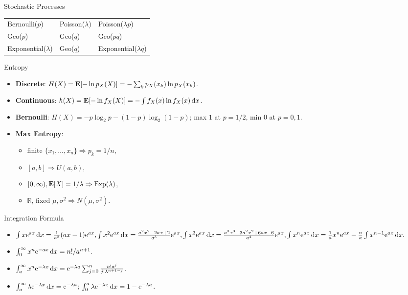 \documentclass[landscape,a4paper]{article}
\begin{document}
\begin{cheatsheetcolumns}
\begin{card}{Stochastic Processes}
\begin{itemize}
\begin{center}
\begin{tabular}{@{}lll@{}}
						Bernoulli($p$) & Poisson($\lambda$) & Poisson($\lambda p$)\\
						Geo($p$) & Geo($q$) & Geo($pq$)\\
						Exponential($\lambda$) & Geo($q$) & Exponential($\lambda q$)
					\end{tabular}
				\end{center}
			\end{itemize}
		\end{card}
		\begin{card}{Entropy}
			\begin{itemize}
				\item \textbf{Discrete}: $H(X)=\mathbf{E}[-\ln p_X(X)]=-\sum_k p_X(x_k)\ln p_X(x_k)$.
				\item \textbf{Continuous}: $h(X)=\mathbf{E}[-\ln f_X(X)]=-\int f_X(x)\ln f_X(x)\,\mathrm dx$.
				\item \textbf{Bernoulli}: $H(X)=-p\log_2p-(1-p)\log_2(1-p)$; max $1$ at $p=1/2$, min $0$ at $p=0,1$.
				\item \textbf{Max Entropy}:
				\begin{itemize}
					\item finite $\{x_1,\dots,x_n\}\Rightarrow p_k=1/n$,
					\item $[a,b]\Rightarrow U(a,b)$,
					\item $[0,\infty),\mathbf{E}[X]=1/\lambda\Rightarrow \operatorname{Exp}(\lambda)$,
					\item $\mathbb R$, fixed $\mu,\sigma^2\Rightarrow N(\mu,\sigma^2)$.
				\end{itemize}
			\end{itemize}
		\end{card}
		\begin{card}{Integration Formula}
			\begin{itemize}
				\item $\int x\mathrm{e}^{ax}\,\mathrm dx=\frac{1}{a^2}(ax-1)\mathrm{e}^{ax},\int x^2\mathrm{e}^{ax}\,\mathrm dx=\frac{a^2x^2-2ax+2}{a^3}\mathrm{e}^{ax},\int x^3\mathrm{e}^{ax}\,\mathrm dx=\frac{a^3x^3-3a^2x^2+6ax-6}{a^4}\mathrm{e}^{ax},\int x^n\mathrm{e}^{ax}\,\mathrm dx=\frac{1}{a}x^n\mathrm{e}^{ax}-\frac{n}{a}\int x^{n-1}\mathrm{e}^{ax}\,\mathrm dx.$
				\item $\int_0^{\infty}x^n\mathrm{e}^{-ax}\,\mathrm dx=n!/a^{n+1}.$
				\item $\int_a^\infty x^n\mathrm{e}^{-\lambda x}\,\mathrm dx=\mathrm{e}^{-\lambda a}\sum_{j=0}^n\frac{n!a^j}{j!\lambda^{n+1-j}}$.
				\item $\int_a^\infty\lambda\mathrm{e}^{-\lambda x}\,\mathrm dx=\mathrm{e}^{-\lambda a}$; $\int_0^a\lambda\mathrm{e}^{-\lambda x}\,\mathrm dx=1-\mathrm{e}^{-\lambda a}$.

\end{itemize}
\end{card}
\end{cheatsheetcolumns}
\end{document}

